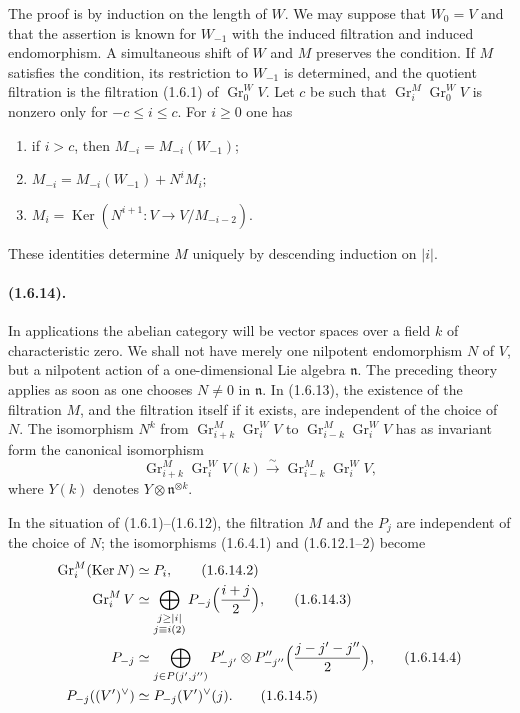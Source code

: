 \documentclass[11pt]{article}
\theoremstyle{remark}
\newcommand{\Gr}{\operatorname{Gr}}
\newcommand{\Ker}{\operatorname{Ker}}
\begin{document}
The proof is by induction on the length of $W$. We may suppose that $W_0=V$ and that the assertion is known for $W_{-1}$ with the induced filtration and induced endomorphism. A simultaneous shift of $W$ and $M$ preserves the condition. If $M$ satisfies the condition, its restriction to $W_{-1}$ is determined, and the quotient filtration is the filtration (1.6.1) of $\Gr^W_0V$. Let $c$ be such that $\Gr^M_i\Gr^W_0V$ is nonzero only for $-c\le i\le c$. For $i\ge0$ one has
\begin{enumerate}[label=\arabic*)]
\item if $i>c$, then $M_{-i}=M_{-i}(W_{-1})$;
\item $M_{-i}=M_{-i}(W_{-1})+N^iM_i$;
\item $M_i=\Ker(N^{i+1}:V\to V/M_{-i-2}).$
\end{enumerate}
These identities determine $M$ uniquely by descending induction on $|i|$.

\paragraph{(1.6.14).} In applications the abelian category will be vector spaces over a field $k$ of characteristic zero. We shall not have merely one nilpotent endomorphism $N$ of $V$, but a nilpotent action of a one-dimensional Lie algebra $\mathfrak n$. The preceding theory applies as soon as one chooses $N\ne0$ in $\mathfrak n$. In (1.6.13), the existence of the filtration $M$, and the filtration itself if it exists, are independent of the choice of $N$. The isomorphism $N^k$ from $\Gr^M_{i+k}\Gr^W_iV$ to $\Gr^M_{i-k}\Gr^W_iV$ has as invariant form the canonical isomorphism
\begin{equation}\tag{1.6.14.1}
        \Gr^M_{i+k}\Gr^W_iV(k)\xrightarrow{\sim}\Gr^M_{i-k}\Gr^W_iV,
\end{equation}
where $Y(k)$ denotes $Y\otimes\mathfrak n^{\otimes k}$.

In the situation of (1.6.1)--(1.6.12), the filtration $M$ and the $P_j$ are independent of the choice of $N$; the isomorphisms (1.6.4.1) and (1.6.12.1--2) become
\begin{align}
        \Gr^M_i(\Ker N)&\simeq P_i, \tag{1.6.14.2}\\
        \Gr^M_iV&\simeq \bigoplus_{\substack{j\ge |i|\\j\equiv i(2)}}P_{-j}\Bigl(\frac{i+j}{2}\Bigr),\tag{1.6.14.3}\\
        P_{-j}&\simeq \bigoplus_{j\in P(j',j'')} P'_{-j'}\otimes P''_{-j''}\Bigl(\frac{j-j'-j''}{2}\Bigr),\tag{1.6.14.4}\\
        P_{-j}((V')^\vee)&\simeq P_{-j}(V')^\vee(j).\tag{1.6.14.5}
\end{align}
\end{document}
